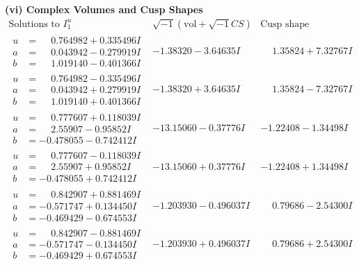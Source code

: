 \documentclass[1p]{elsarticle_modified}
\theoremstyle{definition}
\newcommand{\I}{\sqrt{-1}}
\begin{document}
\newpage\flushleft \textbf{(vi) Complex Volumes and Cusp Shapes}
$$\begin{array}{c|c|c}  
\text{Solutions to }I^u_{1}& \I (\text{vol} + \sqrt{-1}CS) & \text{Cusp shape}\\
 \hline 
\begin{aligned}
u &= \phantom{-}0.764982 + 0.335496 I \\
a &= \phantom{-}0.043942 - 0.279919 I \\
b &= \phantom{-}1.019140 - 0.401366 I\end{aligned}
 & -1.38320 - 3.64635 I & \phantom{-}1.35824 + 7.32767 I \\ \hline\begin{aligned}
u &= \phantom{-}0.764982 - 0.335496 I \\
a &= \phantom{-}0.043942 + 0.279919 I \\
b &= \phantom{-}1.019140 + 0.401366 I\end{aligned}
 & -1.38320 + 3.64635 I & \phantom{-}1.35824 - 7.32767 I \\ \hline\begin{aligned}
u &= \phantom{-}0.777607 + 0.118039 I \\
a &= \phantom{-}2.55907 - 0.95852 I \\
b &= -0.478055 - 0.742412 I\end{aligned}
 & -13.15060 - 0.37776 I & -1.22408 - 1.34498 I \\ \hline\begin{aligned}
u &= \phantom{-}0.777607 - 0.118039 I \\
a &= \phantom{-}2.55907 + 0.95852 I \\
b &= -0.478055 + 0.742412 I\end{aligned}
 & -13.15060 + 0.37776 I & -1.22408 + 1.34498 I \\ \hline\begin{aligned}
u &= \phantom{-}0.842907 + 0.881469 I \\
a &= -0.571747 + 0.134450 I \\
b &= -0.469429 - 0.674553 I\end{aligned}
 & -1.203930 - 0.496037 I & \phantom{-}0.79686 - 2.54300 I \\ \hline\begin{aligned}
u &= \phantom{-}0.842907 - 0.881469 I \\
a &= -0.571747 - 0.134450 I \\
b &= -0.469429 + 0.674553 I\end{aligned}
 & -1.203930 + 0.496037 I & \phantom{-}0.79686 + 2.54300 I \\ \hline\begin{aligned}

\end{aligned}
\end{array}$$
\end{document}
